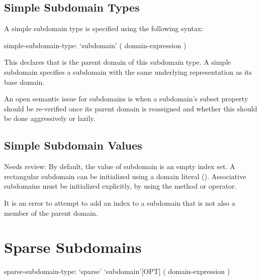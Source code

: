 \subsection{Simple Subdomain Types}
\label{Simple_Subdomain_Types}

A simple subdomain type is specified using the following syntax:
\begin{syntax}
simple-subdomain-type:
  `subdomain' ( domain-expression )
\end{syntax}

This declares that  is the parent domain of
this subdomain type.  A simple subdomain specifies a subdomain
with the same underlying representation as its base domain.  

\begin{openissue}

An open semantic issue for subdomains is when a subdomain's subset
property should be re-verified once its parent domain is reassigned
and whether this should be done aggressively or lazily.

\end{openissue}

\subsection{Simple Subdomain Values}


\begin{openissue}
Needs review:  By default, the value of subdomain is an empty index set.  A rectangular subdomain
can be initialized using a domain literal ().
Associative subdomains must be initialized explicitly, by using the 
method or \chpl{+} operator.

It is an error to attempt to add an index to a subdomain that is not also
a member of the parent domain.

\end{openissue}
\section{Sparse Subdomains}
\label{Sparse_Subdomains}

\begin{syntax}
sparse-subdomain-type:
  `sparse' `subdomain'[OPT] ( domain-expression )
\end{syntax}

